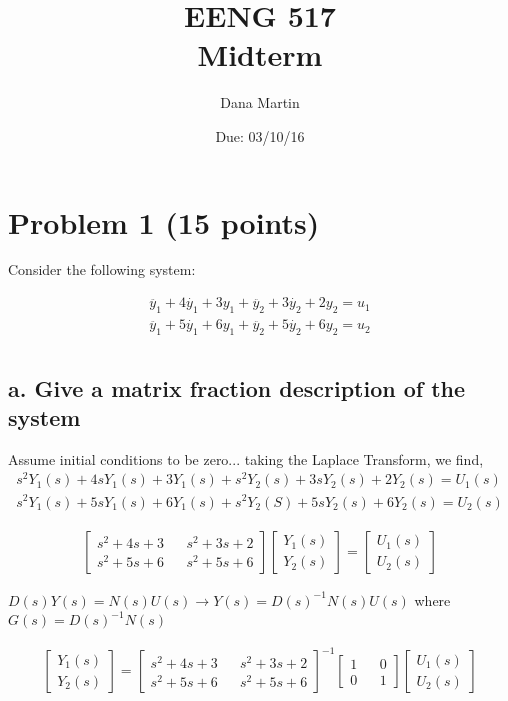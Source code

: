 \documentclass[paper=a4,margin, fontsize=11pt]{scrartcl} %
\title{	
\normalfont \normalsize 
\textsc{EENG 517}\\ 
\huge Midterm \\ %
}
\author{Dana Martin} %
\date{\normalsize Due: 03/10/16}
\numberwithin{equation}{section} %
\numberwithin{figure}{section} %
\numberwithin{table}{section} %
\begin{document}
\maketitle %


\section*{Problem 1 (15 points)}
Consider the following system:

\begin{align*}
\ddot{y_1}+4\dot{y_1}+3y_1+\ddot{y_2}+3\dot{y_2}+2y_2=u_1\\
\ddot{y_1}+5\dot{y_1}+6y_1+\ddot{y_2}+5\dot{y_2}+6y_2=u_2\\
\end{align*}

\subsection*{a. Give a matrix fraction description of the system}
Assume initial conditions to be zero... taking the Laplace Transform, we find,
\begin{align}
s^2Y_1(s)+4sY_1(s)+3Y_1(s)+s^2Y_2(s)+3sY_2(s)+2Y_2(s)=U_1(s)\\
s^2Y_1(s)+5sY_1(s)+6Y_1(s)+s^2Y_2(S)+5sY_2(s)+6Y_2(s)=U_2(s)
\end{align}

\begin{align*}	
\begin{bmatrix}s^2+4s+3 && s^2+3s+2 \\ s^2+5s+6 && s^2+5s+6 \end{bmatrix} \begin{bmatrix}Y_1(s) \\ Y_2(s) \end{bmatrix} = \begin{bmatrix} U_1(s) \\ U_2(s)\end{bmatrix}
\end{align*}

$D(s)Y(s)=N(s)U(s)\rightarrow Y(s)=D(s)^{-1}N(s)U(s)$ where $G(s)=D(s)^{-1}N(s)$

\begin{align}
	\begin{bmatrix}
		Y_1(s)\\Y_2(s)
	\end{bmatrix}
	= \begin{bmatrix}s^2+4s+3 && s^2+3s+2\\ s^2+5s+6 && s^2+5s+6 \end{bmatrix}^{-1}\begin{bmatrix}1 && 0\\0 &&1\end{bmatrix}\begin{bmatrix}U_1(s)\\U_2(s)\end{bmatrix}
\end{align}\\
\end{document}
